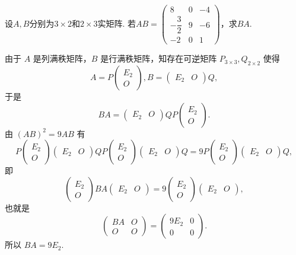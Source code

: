 \begin{exercise}
\begin{exgroup}
        \item 设$A,B$分别为$3 \times 2$和$2 \times 3$实矩阵. 若$AB=\begin{pmatrix}
                8             & 0 & -4 \\[1ex]
                -\dfrac{3}{2} & 9 & -6 \\[1ex]
                -2            & 0 & 1
            \end{pmatrix}$，求$BA$.
        \begin{answer}
            由于 $A$ 是列满秩矩阵，$B$ 是行满秩矩阵，知存在可逆矩阵 $P_{3\times 3},Q_{2\times 2}$ 使得
            \[A=P\begin{pmatrix}E_2 \\ O\end{pmatrix},B=\begin{pmatrix}E_2 & O\end{pmatrix}Q,\]
            于是
            \[BA=\begin{pmatrix}E_2 & O\end{pmatrix}QP\begin{pmatrix}E_2 \\ O\end{pmatrix}.\]
            由 $(AB)^2=9AB$ 有 \[P\begin{pmatrix}E_2 \\ O\end{pmatrix}\begin{pmatrix}E_2 & O\end{pmatrix}QP\begin{pmatrix}E_2 \\ O\end{pmatrix}\begin{pmatrix}E_2 & O\end{pmatrix}Q=9P\begin{pmatrix}E_2 \\ O\end{pmatrix}\begin{pmatrix}E_2 & O\end{pmatrix}Q,\]
            即
            \[\begin{pmatrix}E_2 \\ O\end{pmatrix}BA\begin{pmatrix}E_2 & O\end{pmatrix}=9\begin{pmatrix}E_2 \\ O\end{pmatrix}\begin{pmatrix}E_2 & O\end{pmatrix},\]
            也就是 \[\begin{pmatrix}BA & O \\ O & O\end{pmatrix}=\begin{pmatrix}9E_2 & 0 \\ 0 & 0\end{pmatrix}.\]
            所以 $BA=9E_2$.
        \end{answer}
    \end{exgroup}
\end{exercise}
